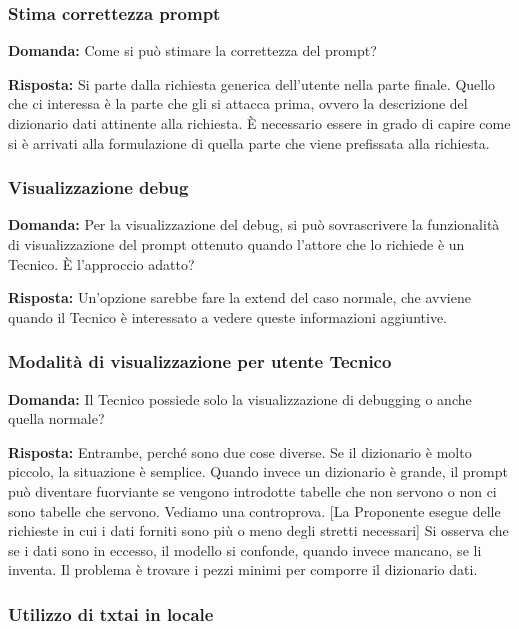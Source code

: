 \subsubsection{Stima correttezza prompt}

\textbf{Domanda:} Come si può stimare la correttezza del prompt?

\textbf{Risposta:} Si parte dalla richiesta generica dell'utente nella parte finale. Quello che ci interessa è la parte che gli si attacca prima, ovvero la descrizione del dizionario dati attinente alla richiesta. È necessario essere in grado di capire come si è arrivati alla formulazione di quella parte che viene prefissata alla richiesta.

\subsubsection{Visualizzazione debug}

\textbf{Domanda:} Per la visualizzazione del debug, si può sovrascrivere la funzionalità di visualizzazione del prompt ottenuto quando l’attore che lo richiede è un Tecnico. È l’approccio adatto?

\textbf{Risposta:} Un’opzione sarebbe fare la extend del caso normale, che avviene quando il Tecnico è interessato a vedere queste informazioni aggiuntive.


\subsubsection{Modalità di visualizzazione per utente Tecnico}

\textbf{Domanda:} Il Tecnico possiede solo la visualizzazione di debugging o anche quella normale?


\textbf{Risposta:} Entrambe, perché sono due cose diverse. Se il dizionario è molto piccolo, la situazione è semplice. Quando invece un dizionario è grande, il prompt può diventare fuorviante se vengono introdotte tabelle che non servono o non ci sono tabelle che servono. Vediamo una controprova.
[La Proponente esegue delle richieste in cui i dati forniti sono più o meno degli stretti necessari]
Si osserva che se i dati sono in eccesso, il modello si confonde, quando invece mancano, se li inventa. Il problema è trovare i pezzi minimi per comporre il dizionario dati.

\subsubsection{Utilizzo di txtai in locale}

